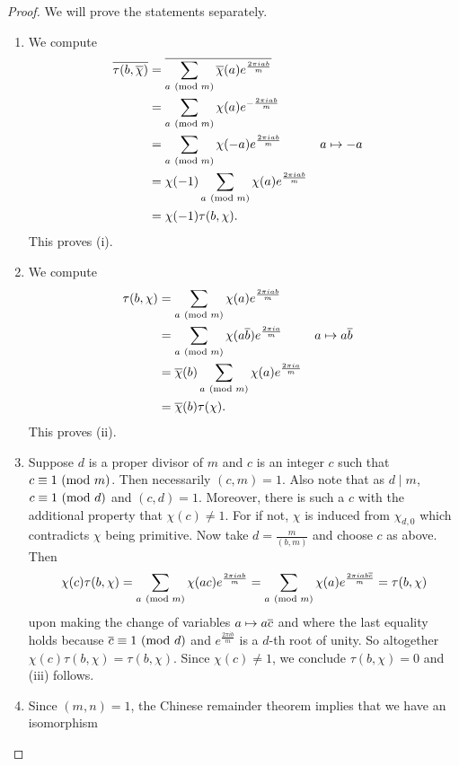       \begin{proof}
        We will prove the statements separately.
        \begin{enumerate}[label*=(\roman*)]
          \item We compute
          \begin{align*}
            \overline{\tau(b,\overline{\chi})} &= \overline{\sum_{a \ (\mathrm{mod}\text{ }m)}\overline{\chi}(a)e^{\frac{2\pi iab}{m}}} \\
            &= \sum_{a \ (\mathrm{mod}\text{ }m)}\chi(a)e^{-\frac{2\pi iab}{m}} \\
            &= \sum_{a \ (\mathrm{mod}\text{ }m)}\chi(-a)e^{\frac{2\pi iab}{m}} && \text{$a \mapsto -a$} \\
            &= \chi(-1)\sum_{a \ (\mathrm{mod}\text{ }m)}\chi(a)e^{\frac{2\pi iab}{m}} \\
            &= \chi(-1)\tau(b,\chi).
          \end{align*}
          This proves (i).
          \item We compute
          \begin{align*}
            \tau(b,\chi) &= \sum_{a \ (\mathrm{mod}\text{ }m)}\chi(a)e^{\frac{2\pi iab}{m}} \\
            &= \sum_{a \ (\mathrm{mod}\text{ }m)}\chi(a\overline{b})e^{\frac{2\pi ia}{m}} && \text{$a \mapsto a\overline{b}$} \\
            &= \overline{\chi}(b)\sum_{a \ (\mathrm{mod}\text{ }m)}\chi(a)e^{\frac{2\pi ia}{m}} \\
            &= \overline{\chi}(b)\tau(\chi).
          \end{align*}
          This proves (ii).
          \item Suppose $d$ is a proper divisor of $m$ and $c$ is an integer $c$ such that $c \equiv 1 \ (\mathrm{mod}\text{ }m)$. Then necessarily $(c,m) = 1$. Also note that as $d \mid m$, $c \equiv 1 \ (\mathrm{mod}\text{ }d)$ and $(c,d) = 1$. Moreover, there is such a $c$ with the additional property that $\chi(c) \neq 1$. For if not, $\chi$ is induced from $\chi_{d,0}$ which contradicts $\chi$ being primitive. Now take $d = \frac{m}{(b,m)}$ and choose $c$ as above. Then
          \[
            \chi(c)\tau(b,\chi) = \sum_{a \ (\mathrm{mod}\text{ }m)}\chi(ac)e^{\frac{2\pi iab}{m}} = \sum_{a \ (\mathrm{mod}\text{ }m)}\chi(a)e^{\frac{2\pi iab\overline{c}}{m}} = \tau(b,\chi)
          \]
          upon making the change of variables $a \mapsto a\overline{c}$ and where the last equality holds because $\overline{c} \equiv 1 \ (\mathrm{mod}\text{ }d)$ and $e^{\frac{2\pi ib}{m}}$ is a $d$-th root of unity. So altogether $\chi(c)\tau(b,\chi) = \tau(b,\chi)$. Since $\chi(c) \neq 1$, we conclude $\tau(b,\chi) = 0$ and (iii) follows.
          \item Since $(m,n) = 1$, the Chinese remainder theorem implies that we have an isomorphism

\end{enumerate}
\end{proof}

